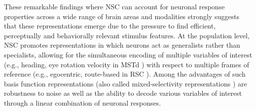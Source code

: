 These remarkable findings where \ac{NSC} can account for neuronal response properties across a wide range of
brain areas and modalities strongly suggests that these 
 representations emerge due to the pressure to find efficient, perceptually and behaviorally relevant stimulus features.
At the population level, \ac{NSC} promotes representations in which
neurons act as generalists rather than specialists,
allowing for the simultaneous encoding of multiple variables of interest
(e.g., heading, eye rotation velocity in \ac{MSTd} \cite{Beyeler2016})
with respect to multiple frames of reference
(e.g., egocentric, route-based in \ac{RSC} \cite{Rounds2016}).
Among the advantages of such basis function representations
\cite{Poggio1990,PougetSejnowski1997,PougetSnyder2000}
(also called mixed-selectivity representations
\cite{Eichenbaum2017,Fusi2016,Barak2013})
are robustness to noise as well as the ability to decode various variables of interest
through a linear combination of neuronal responses.


